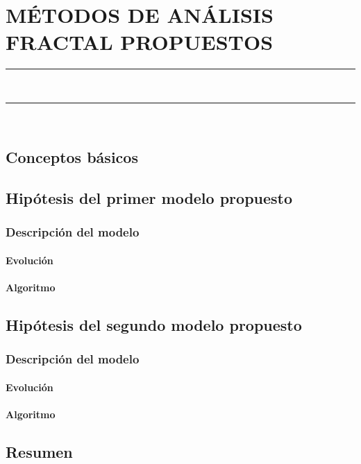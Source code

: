 \pagestyle{plain}
\chapter{MÉTODOS DE ANÁLISIS FRACTAL PROPUESTOS}\label{cap:MetodosAnalisisFractalPropuestos}
\vspace{0.2cm}
\noindent\rule{\linewidth}{1.5pt}\\
\startcontents[chapters]
\vspace{0.2cm}
\noindent\rule{\linewidth}{1.3pt}\\
\newpage
\section{Conceptos básicos}\label{sec:ConceptosBasicos}
\section{Hipótesis del primer modelo propuesto}\label{sec:HipotesisPrimerModelo}
\subsection{Descripción del modelo}
\subsubsection{Evolución}
\subsubsection{Algoritmo}
\section{Hipótesis del segundo modelo propuesto}\label{sec:HipotesisSegundoModelo}
\subsection{Descripción del modelo}
\subsubsection{Evolución}
\subsubsection{Algoritmo}
\section{Resumen}


\newpage
		
